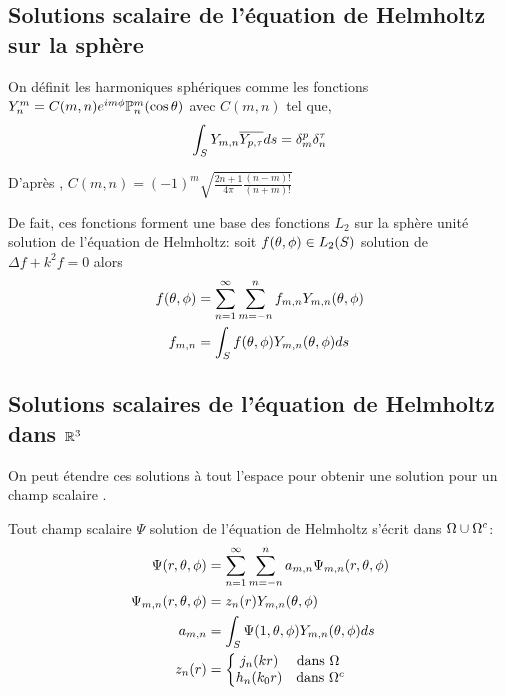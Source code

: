 \subsection{Solutions scalaire de l'équation de Helmholtz sur la sphère}

On définit les harmoniques sphériques comme les fonctions $Y_n^m = C(m,n) e^{im\phi}\mathbb{P}^m_n(\cos \theta) $ avec $C(m,n)$ tel que,
\[
 \displaystyle\int_S Y_{m,n} {\overline{Y_{p,\tau}}} ds = \delta_m^p \delta_n^\tau
\]

D’après \cite[p.~24]{nedelec_acoustic_2001}, $ C(m,n) = (-1)^m\sqrt{\frac{2n+1}{4\pi}\frac{(n-m)!}{(n+m)!}}$

De fait, ces fonctions forment une base des fonctions $L_2$ sur la sphère unité solution de l'équation de Helmholtz: soit $f(\theta,\phi) \in L_2(S)$ solution de $ \Delta f + k^2 f = 0 $ alors
  \begin{align}
    f(\theta,\phi) &= \sum\limits_{n=1}^\infty\sum\limits_{m=-n}^n f_{m,n} Y_{m,n} (\theta,\phi)\\
    \notag f_{m,n} &= \int_S f(\theta,\phi) Y_{m,n}(\theta,\phi) ds
  \end{align}


\subsection{Solutions scalaires de l'équation de Helmholtz dans $\mathbb R^3$}
On peut étendre ces solutions à tout l'espace pour obtenir une solution pour un champ scalaire .

Tout champ scalaire $\Psi$ solution de l'équation de Helmholtz s'écrit dans $\Omega\cup\Omega^c$:
\begin{align} 
\label{eq:helm:sol_helmoltz_scal_somme}
\Psi(r,\theta,\phi) &= \sum\limits_{n=1}^\infty\sum\limits_{m=-n}^n a_{m,n} \Psi_{m,n}(r,\theta,\phi) \\
\Psi_{m,n}(r,\theta,\phi) &= z_n(r) Y_{m,n}(\theta,\phi) \\
\notag a_{m,n} &= \int_S \Psi(1,\theta,\phi) Y_{m,n}(\theta,\phi) ds \\
z_n(r) &= \left\lbrace
  \begin{matrix}
  j_n(kr) &   \text{dans $\Omega~$} \\
  h_n(k_0r) & \text{dans $\Omega^c$} \\
  \end{matrix}\right.
\end{align}
